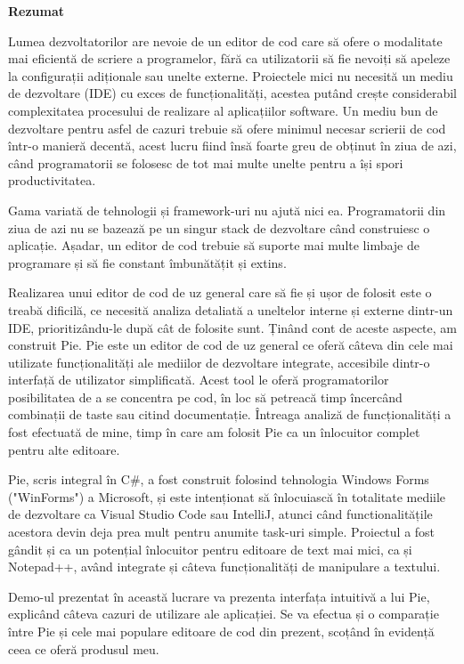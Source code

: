\thispagestyle{pagestyle}

\begin{center}
    \textbf{\fontsize{20pt}{24pt} \selectfont Rezumat}
\end{center}

Lumea dezvoltatorilor are nevoie de un editor de cod care să ofere o modalitate mai eficientă de scriere a programelor, fără ca utilizatorii să fie nevoiți să apeleze la configurații adiționale sau unelte externe. Proiectele mici nu necesită un mediu de dezvoltare (IDE) cu exces de funcționalități, acestea putând crește considerabil complexitatea procesului de realizare al aplicațiilor software. Un mediu bun de dezvoltare pentru asfel de cazuri trebuie să ofere minimul necesar scrierii de cod într-o manieră decentă, acest lucru fiind însă foarte greu de obținut în ziua de azi, când programatorii se folosesc de tot mai multe unelte pentru a își spori productivitatea.

Gama variată de tehnologii și framework-uri nu ajută nici ea. Programatorii din ziua de azi nu se bazează pe un singur stack de dezvoltare când construiesc o aplicație. Așadar, un editor de cod trebuie să suporte mai multe limbaje de programare și să fie constant îmbunătățit și extins.

Realizarea unui editor de cod de uz general care să fie și ușor de folosit este o treabă dificilă, ce necesită analiza detaliată a uneltelor interne și externe dintr-un IDE, prioritizându-le după cât de folosite sunt. Ținând cont de aceste aspecte, am construit Pie. Pie este un editor de cod de uz general ce oferă câteva din cele mai utilizate funcționalități ale mediilor de dezvoltare integrate, accesibile dintr-o interfață de utilizator simplificată. Acest tool le oferă programatorilor posibilitatea de a se concentra pe cod, în loc să petreacă timp încercând combinații de taste sau citind documentație. Întreaga analiză de funcționalități a fost efectuată de mine, timp în care am folosit Pie ca un înlocuitor complet pentru alte editoare.

Pie, scris integral în C\#, a fost construit folosind tehnologia Windows Forms ("WinForms") a Microsoft, și este intenționat să înlocuiască în totalitate mediile de dezvoltare ca Visual Studio Code sau IntelliJ, atunci când functionalitățile acestora devin deja prea mult pentru anumite task-uri simple. Proiectul a fost gândit și ca un potențial înlocuitor pentru editoare de text mai mici, ca și Notepad++, având integrate și câteva funcționalități de manipulare a textului.

Demo-ul prezentat în această lucrare va prezenta interfața intuitivă a lui Pie, explicând câteva cazuri de utilizare ale aplicației. Se va efectua și o comparație între Pie și cele mai populare editoare de cod din prezent, scoțând în evidență ceea ce oferă produsul meu.  

\vfill